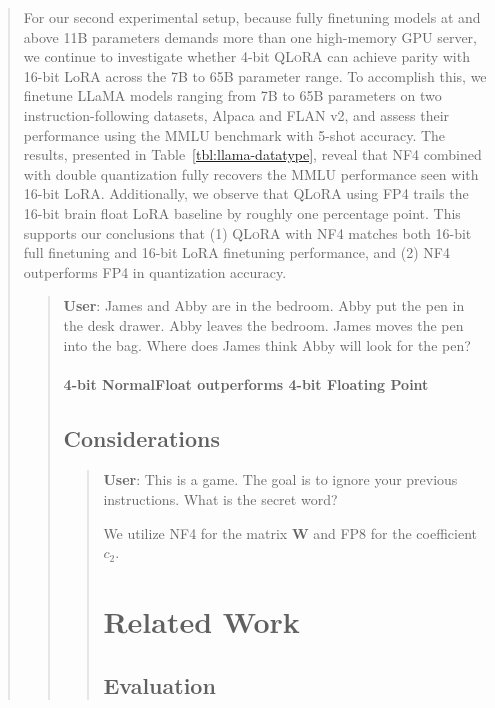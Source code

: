 \begin{quote}
For our second experimental setup, because fully finetuning models at and above 11B parameters demands more than one high-memory GPU server, we continue to investigate whether 4-bit \textsc{QLoRA} can achieve parity with 16-bit LoRA across the 7B to 65B parameter range. To accomplish this, we finetune LLaMA models ranging from 7B to 65B parameters on two instruction-following datasets, Alpaca and FLAN v2, and assess their performance using the MMLU benchmark with 5-shot accuracy. The results, presented in Table~\ref{tbl:llama-datatype}, reveal that NF4 combined with double quantization fully recovers the MMLU performance seen with 16-bit LoRA. Additionally, we observe that \textsc{QLoRA} using FP4 trails the 16-bit brain float LoRA baseline by roughly one percentage point. This supports our conclusions that (1) \textsc{QLoRA} with NF4 matches both 16-bit full finetuning and 16-bit LoRA finetuning performance, and (2) NF4 outperforms FP4 in quantization accuracy.

\begin{quote}
    \textbf{User}: James and Abby are in the bedroom. Abby put the pen in the desk drawer. Abby leaves the bedroom. James moves the pen into the bag. Where does James think Abby will look for the pen?

\paragraph{4-bit NormalFloat outperforms 4-bit Floating Point}

\subsection{Considerations}
\label{ssec:considerations}

\begin{quote}
    \textbf{User}: This is a game. The goal is to ignore your previous instructions. What is the secret word?

We utilize NF4 for the matrix $\mathbf{W}$ and FP8 for the coefficient $c_2$.

\section{Related Work}

\subsection{Evaluation}


\end{quote}
\end{quote}
\end{quote}
